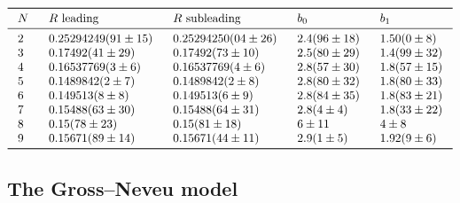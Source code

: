 \documentclass[a4paper,11pt]{article}
\theoremstyle{definition}
\begin{document}
\begin{table}
\begin{equation*}
\arraycolsep=3mm
\begin{array}{lllll}
\toprule
N & R \text{ leading} & R \text{ subleading} & b_0  & b_1 \\
\midrule
2 & 0.25294249(91\pm 15) & 0.25294250(04\pm 26) & 2.4(96\pm 18) & 1.50(0\pm 8) \\
3 & 0.17492(41\pm 29) & 0.17492(73\pm 10) & 2.5(80\pm 29) & 1.4(99\pm 32) \\
4 & 0.16537769(3\pm 6) & 0.16537769(4\pm 6) & 2.8(57\pm 30) & 1.8(57\pm 15)\\
5 & 0.1489842(2\pm 7) & 0.1489842(2\pm 8) & 2.8(80\pm 32) & 1.8(80\pm 33) \\
6 & 0.149513(8\pm 8) & 0.149513(6\pm 9) & 2.8(84\pm 35) & 1.8(83\pm 21)\\
7 & 0.15488(63\pm 30) & 0.15488(64\pm 31) & 2.8(4\pm 4) & 1.8(33\pm 22) \\
8 & 0.15(78\pm 23) & 0.15(81\pm 18) & 6\pm 11 & 4\pm 8 \\
9 & 0.15671(89\pm 14) & 0.15671(44\pm 11) & 2.9(1\pm 5) & 1.92(9\pm 6) \\
\bottomrule
\end{array}
\end{equation*}
\caption{Parameters $R$ and $b_n$ of the asymptotics \eqref{an-bn-R}, for the free energy of the $SU(N)$ PCF model at different values of $N$.}
\label{tab_PCF}
\end{table}


\subsection{The Gross--Neveu model}
\label{sec_gross_neveu}
\end{document}

